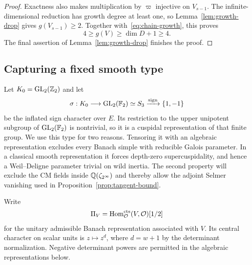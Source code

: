 \begin{proof}
Exactness also makes multiplication by $\varpi$ injective on
$V_{s-1}$.  The infinite-dimensional reduction has growth degree at
least one, so Lemma~\ref{lem:growth-drop} gives $g(V_{s-1})\geq2$.
Together with~\eqref{eq:chain-growth}, this proves
\[
                    4\geq g(V)\geq\dim D+1\geq4.
\]
The final assertion of Lemma~\ref{lem:growth-drop} finishes the proof.
\end{proof}

\subsection{Capturing a fixed smooth type}

Let $K_0=\operatorname{GL}_2(\mathbb Z_2)$ and let
\[
 \sigma:K_0\longrightarrow\operatorname{GL}_2(\mathbb F_2)\simeq S_3
              \xrightarrow{\operatorname{sign}}\{1,-1\}
\]
be the inflated sign character over $E$. Its restriction to the upper
unipotent subgroup of $\operatorname{GL}_2(\mathbb F_2)$ is nontrivial, so it is a cuspidal
representation of that finite group. We use this type for two reasons.
Tensoring it with an algebraic representation excludes every Banach
simple with reducible Galois parameter. In a classical smooth representation it
forces depth-zero supercuspidality, and hence a Weil--Deligne parameter
trivial on wild inertia. The second property will exclude the CM fields
inside $\mathbb Q(\zeta_{2^\infty})$ and thereby allow the adjoint Selmer
vanishing used in Proposition~\ref{prop:tangent-bound}.

Write
\[
          \Pi_V=\operatorname{Hom}_{\mathcal O}^{\mathrm{cts}}(V,\mathcal O)[1/2]
\]
for the unitary admissible Banach representation associated with $V$.
Its central character on scalar units is $z\mapsto z^{d}$, where
$d=w+1$ by the determinant normalization.  Negative determinant
powers are permitted in the algebraic representations below.


